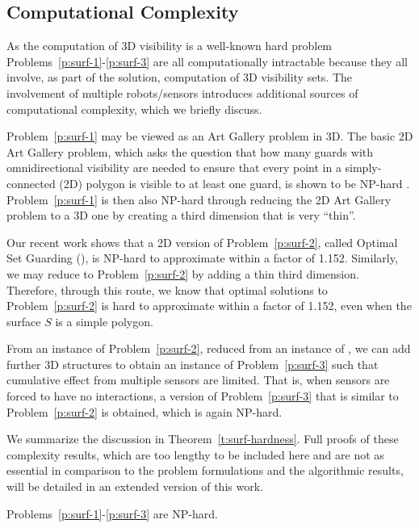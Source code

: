 \subsection{Computational Complexity}\label{subsec:surf-complexity}
\vspace{-1mm}
As the computation of 3D visibility is a well-known hard problem \cite{canny1987new}
Problems~\ref{p:surf-1}-\ref{p:surf-3} are all computationally intractable because they all involve, as part of the solution, computation of 3D visibility sets. The involvement of multiple robots/sensors introduces additional sources of computational complexity, which we briefly discuss. 

Problem~\ref{p:surf-1} may be viewed as an Art Gallery \cite{o1987art} problem in 3D. 
The basic 2D Art Gallery problem, which asks the question that how many guards with omnidirectional visibility are needed to ensure that 
every point in a simply-connected (2D) polygon is visible to at least one guard, is shown to be NP-hard \cite{lee1986computational}. 
Problem~\ref{p:surf-1} is then also NP-hard through reducing the 2D Art Gallery problem to a 3D one by 
creating a third dimension that is very ``thin''.

Our recent work \cite{fengyu2020optimally} shows that a 2D version of Problem~\ref{p:surf-2}, called Optimal Set Guarding (\osg), 
is NP-hard to approximate within a factor of 1.152. Similarly, we may reduce \osg to Problem~\ref{p:surf-2} by adding a thin third dimension. 
Therefore, through this route, we know that optimal solutions to Problem~\ref{p:surf-2} is hard to approximate within a factor of 1.152, 
even when the surface $S$  is a simple polygon. 

From an instance of Problem~\ref{p:surf-2}, reduced from an instance of \osg, 
we can add further 3D structures to obtain an instance of Problem~\ref{p:surf-3} such that cumulative effect from multiple sensors are limited. 
That is, when sensors are forced to have no interactions, a version of Problem~\ref{p:surf-3} that is similar to Problem~\ref{p:surf-2} is obtained, 
which is again NP-hard. 

We summarize the discussion in Theorem~\ref{t:surf-hardness}. Full proofs of these complexity results, 
which are too lengthy to be included here and are not as essential in comparison to the problem formulations and the algorithmic results, 
will be detailed in an extended version of this work. 
\vspace{-1mm}

\begin{theorem}\label{t:surf-hardness}
Problems~\ref{p:surf-1}-\ref{p:surf-3} are NP-hard.
\end{theorem}
    \vspace{-2mm}




